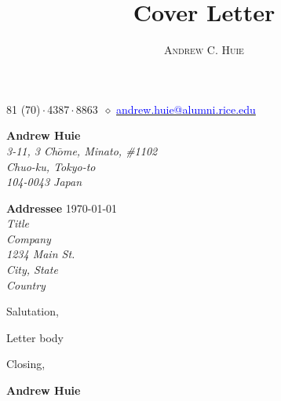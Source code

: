 \documentclass[12pt, a4paper]{article}
\makeatletter
\renewcommand{\maketitle}{
    \begin{center}
        {\Huge\theauthor}

        \vspace{0.25em}

        \raisebox{.3ex}{\footnotesize+}81 (70)\,$\cdot$\,4387\,$\cdot$\,8863~$\diamond$
        \href{mailto:andrew.huie@alumni.rice.edu}{\textcolor{blue}{
            andrew.huie@alumni.rice.edu
        }}

    \end{center}
}
\makeatother
\begin{document}
\title{Cover Letter}
\author{\textsc{Andrew C. Huie}}

\maketitle

\vspace{2em}

\begin{flushright}
    {\color{Gray}
    \textbf{Andrew Huie}\\
    \textsl{
        3-11, 3 Ch$\bar{o}$me, Minato, \#1102\\
        Chuo-ku, Tokyo-to\\
        104-0043 Japan\\
    }}
\end{flushright}

\vspace{1em}

\textbf{Addressee} \hfill \today\\
\textsl{
    Title\\
    Company\\
    1234 Main St.\\
    City, State\\
    Country\\
}

Salutation,

\vspace{0.75em}

Letter body

\vspace{0.75em}

Closing,

\vspace{2em}

\textbf{Andrew Huie}
\end{document}
